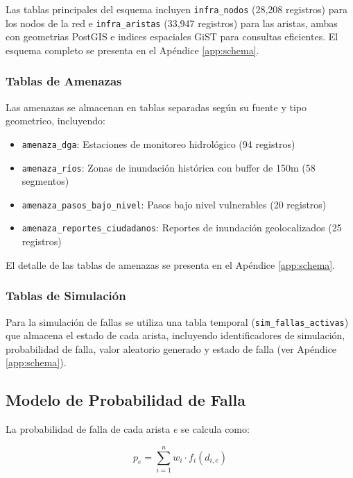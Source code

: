 \documentclass[conference]{IEEEtran}
\begin{document}
Las tablas principales del esquema incluyen \texttt{infra\_nodos} (28,208 registros) para los nodos de la red e \texttt{infra\_aristas} (33,947 registros) para las aristas, ambas con geometrias PostGIS e indices espaciales GiST para consultas eficientes. El esquema completo se presenta en el Apéndice \ref{app:schema}.

\subsubsection{Tablas de Amenazas}

Las amenazas se almacenan en tablas separadas según su fuente y tipo geometrico, incluyendo:

\begin{itemize}
    \item \texttt{amenaza\_dga}: Estaciones de monitoreo hidrológico (94 registros)
    \item \texttt{amenaza\_ríos}: Zonas de inundación histórica con buffer de 150m (58 segmentos)
    \item \texttt{amenaza\_pasos\_bajo\_nivel}: Pasos bajo nivel vulnerables (20 registros)
    \item \texttt{amenaza\_reportes\_ciudadanos}: Reportes de inundación geolocalizados (25 registros)
\end{itemize}

El detalle de las tablas de amenazas se presenta en el Apéndice \ref{app:schema}.

\subsubsection{Tablas de Simulación}

Para la simulación de fallas se utiliza una tabla temporal (\texttt{sim\_fallas\_activas}) que almacena el estado de cada arista, incluyendo identificadores de simulación, probabilidad de falla, valor aleatorio generado y estado de falla (ver Apéndice \ref{app:schema}).

\subsection{Modelo de Probabilidad de Falla}

La probabilidad de falla de cada arista $e$ se calcula como:

\begin{equation}
p_e = \sum_{i=1}^{n} w_i \cdot f_i(d_{i,e})
\end{equation}
\end{document}
